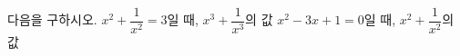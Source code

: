 다음을 구하시오.
 $x^2+\dfrac{1}{x^2}=3$일 때, $x^3+\dfrac{1}{x^3}$의 값 
 $x^2-3x+1=0$일 때, $x^2+\dfrac{1}{x^2}$의 값
